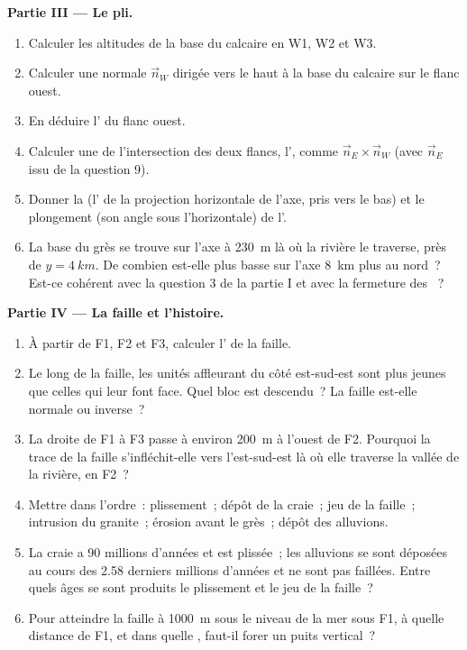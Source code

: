 \begin{problem}
\medskip
\noindent\textbf{Partie III --- Le pli.}
\begin{enumerate}[resume]
  \item Calculer les altitudes de la base du calcaire en W1, W2 et
        W3.
  \item Calculer une normale $\vec n_W$ dirigée vers le haut à la base du
        calcaire sur le flanc ouest.
  \item En déduire l' du flanc ouest.
  \item Calculer une  de l'intersection des deux flancs, l',
        comme $\vec n_E \times \vec n_W$ (avec $\vec n_E$ issu de la question 9).
  \item Donner la  (l' de la projection horizontale de l'axe, pris
        vers le bas) et le plongement (son angle sous l'horizontale) de l'.
  \item La base du grès se trouve sur l'axe à \qty{230}{m} là où la rivière le
        traverse, près de $y = \qty{4}{km}$. De combien est-elle plus basse sur
        l'axe \qty{8}{km} plus au nord~? Est-ce cohérent avec la question 3 de
        la partie I et avec la fermeture des ~?
\end{enumerate}

\medskip
\noindent\textbf{Partie IV --- La faille et l'histoire.}
\begin{enumerate}[resume]
  \item À partir de F1, F2 et F3, calculer l' de la faille.
  \item Le long de la faille, les unités affleurant du côté est-sud-est sont plus
        jeunes que celles qui leur font face. Quel bloc est descendu~? La faille
        est-elle normale ou inverse~?
  \item La droite de F1 à F3 passe à environ \qty{200}{m} à l'ouest de F2.
        Pourquoi la trace de la faille s'infléchit-elle vers l'est-sud-est là où
        elle traverse la vallée de la rivière, en F2~?
  \item Mettre dans l'ordre~: plissement~; dépôt de la craie~; jeu de la faille~;
        intrusion du granite~; érosion avant le grès~; dépôt des alluvions.
  \item La craie a 90 millions d'années et est plissée~; les alluvions se sont
        déposées au cours des 2.58 derniers millions d'années et ne sont pas
        faillées. Entre quels âges se sont produits le plissement et le jeu de la
        faille~?
  \item Pour atteindre la faille à \qty{1000}{m} sous le niveau de la mer sous
        F1, à quelle distance de F1, et dans quelle , faut-il forer un
        puits vertical~?
\end{enumerate}
\end{problem}
